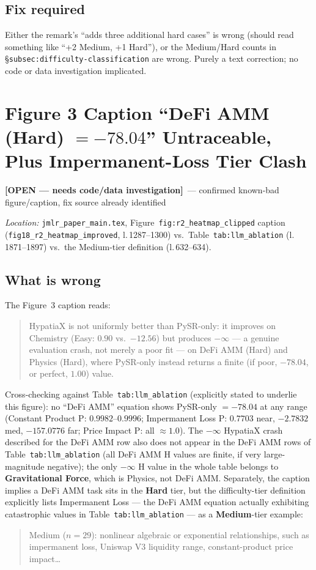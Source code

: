 \documentclass[11pt]{article}
\newcommand{\open}{\textcolor{red!60!black}{\textbf{[OPEN --- needs code/data investigation]}}}
\newcommand{\loc}[1]{\textit{Location:} #1\par}
\newenvironment{evidence}
  {\begin{quote}\small\ttfamily}
  {\end{quote}}
\begin{document}
\subsection*{Fix required}
Either the remark's ``adds three additional hard cases'' is wrong (should
read something like ``+2 Medium, +1 Hard''), or the Medium/Hard counts in
\S\texttt{subsec:difficulty-classification} are wrong. Purely a text
correction; no code or data investigation implicated.

\section{Figure 3 Caption ``DeFi AMM (Hard) $=-78.04$'' Untraceable, Plus Impermanent-Loss Tier Clash}
\label{issue:8}
\open\ --- confirmed known-bad figure/caption, fix source already identified

\loc{\texttt{jmlr\_paper\_main.tex}, Figure~\texttt{fig:r2\_heatmap\_clipped}
caption (\texttt{fig18\_r2\_heatmap\_improved}, l.\,1287--1300) vs.\
Table~\texttt{tab:llm\_ablation} (l.\,1871--1897) vs.\ the Medium-tier
definition (l.\,632--634).}

\subsection*{What is wrong}
The Figure~3 caption reads:
\begin{evidence}
HypatiaX is not uniformly better than PySR-only: it improves on Chemistry
(Easy: $0.90$ vs.\ $-12.56$) but produces $-\infty$ --- a genuine evaluation
crash, not merely a poor fit --- on DeFi AMM (Hard) and Physics (Hard),
where PySR-only instead returns a finite (if poor, $-78.04$, or perfect,
$1.00$) value.
\end{evidence}
Cross-checking against Table~\texttt{tab:llm\_ablation} (explicitly stated to
underlie this figure): no ``DeFi AMM'' equation shows PySR-only $=-78.04$
at any range (Constant Product P: $0.9982$--$0.9996$; Impermanent Loss P:
$0.7703$ near, $-2.7832$ med, $-157.0776$ far; Price Impact P: all
$\approx1.0$). The $-\infty$ HypatiaX crash described for the DeFi AMM row
also does not appear in the DeFi AMM rows of Table~\texttt{tab:llm\_ablation}
(all DeFi AMM H values are finite, if very large-magnitude negative); the
only $-\infty$ H value in the whole table belongs to \textbf{Gravitational
Force}, which is Physics, not DeFi AMM. Separately, the caption implies a
DeFi AMM task sits in the \textbf{Hard} tier, but the difficulty-tier
definition explicitly lists Impermanent Loss --- the DeFi AMM equation
actually exhibiting catastrophic values in Table~\texttt{tab:llm\_ablation}
--- as a \textbf{Medium}-tier example:
\begin{evidence}
Medium ($n=29$): nonlinear algebraic or exponential relationships, such as
impermanent loss, Uniswap V3 liquidity range, constant-product price
impact\ldots
\end{evidence}
\end{document}
